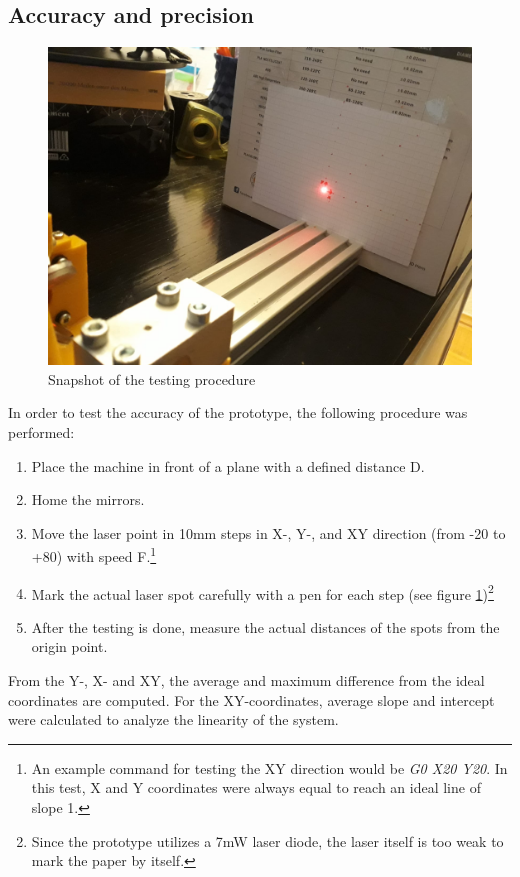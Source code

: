 \documentclass[a4paper, 11pt]{scrartcl}
\begin{document}
\subsection{Accuracy and precision}
\begin{figure}[H]
\begin{center}
\includegraphics[width=15cm]{img/testprocedure.jpeg}
\caption{Snapshot of the testing procedure}
\label{testing}
\end{center}
\end{figure}
In order to test the accuracy of the prototype, the following procedure was performed:
\begin{enumerate}
\item Place the machine in front of a plane with a defined distance D.
\item Home the mirrors.
\item Move the laser point in 10mm steps in X-, Y-, and XY direction (from -20 to +80) with speed F.\footnote{An example command for testing the XY direction would be \textit{G0 X20 Y20}. In this test, X and Y coordinates were always equal to reach an ideal line of slope 1.}
\item Mark the actual laser spot carefully with a pen for each step (see figure \ref{testing})\footnote{Since the prototype utilizes a 7mW laser diode, the laser itself is too weak to mark the paper by itself.}
\item After the testing is done, measure the actual distances of the spots from the origin point.
\end{enumerate}
From the Y-, X- and XY, the average and maximum difference from the ideal coordinates are computed. For the XY-coordinates, average slope and intercept were calculated to analyze the linearity of the system.
\end{document}
